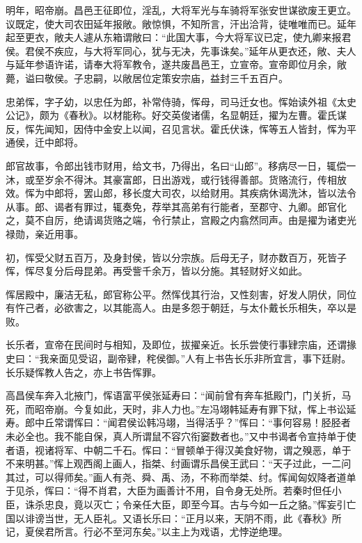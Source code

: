 \documentclass[12pt,UTF8]{ctexbook}
\begin{document}
明年，昭帝崩。昌邑王征即位，淫乱，大将军光与车骑将军张安世谋欲废王更立。议既定，使大司农田延年报敞。敞惊惧，不知所言，汗出洽背，徒唯唯而已。延年起至更衣，敞夫人遽从东箱谓敞曰：“此国大事，今大将军议已定，使九卿来报君侯。君侯不疾应，与大将军同心，犹与无决，先事诛矣。”延年从更衣还，敞、夫人与延年参语许诺，请奉大将军教令，遂共废昌邑王，立宣帝。宣帝即位月余，敞薨，谥曰敬侯。子忠嗣，以敞居位定策安宗庙，益封三千五百户。



忠弟恽，字子幼，以忠任为郎，补常侍骑，恽母，司马迁女也。恽始读外祖《太史公记》，颇为《春秋》。以材能称。好交英俊诸儒，名显朝廷，擢为左曹。霍氏谋反，恽先闻知，因侍中金安上以闻，召见言状。霍氏伏诛，恽等五人皆封，恽为平通侯，迁中郎将。



郎官故事，令郎出钱市财用，给文书，乃得出，名曰“山郎”。移病尽一日，辄偿一沐，或至岁余不得沐。其豪富郎，日出游戏，或行钱得善部。货赂流行，传相放效。恽为中郎将，罢山郎，移长度大司农，以给财用。其疾病休谒洗沐，皆以法令从事。郎、谒者有罪过，辄奏免，荐举其高弟有行能者，至郡守、九卿。郎官化之，莫不自厉，绝请谒货赂之端，令行禁止，宫殿之内翕然同声。由是擢为诸吏光禄勋，亲近用事。



初，恽受父财五百万，及身封侯，皆以分宗族。后母无子，财亦数百万，死皆子恽，恽尽复分后母昆弟。再受訾千余万，皆以分施。其轻财好义如此。



恽居殿中，廉洁无私，郎官称公平。然恽伐其行治，又性刻害，好发人阴伏，同位有忤己者，必欲害之，以其能高人。由是多怨于朝廷，与太仆戴长乐相失，卒以是败。



长乐者，宣帝在民间时与相知，及即位，拔擢亲近。长乐尝使行事肄宗庙，还谓掾史曰：“我亲面见受诏，副帝肄，秺侯御。”人有上书告长乐非所宜言，事下廷尉。长乐疑恽教人告之，亦上书告恽罪。



高昌侯车奔入北掖门，恽语富平侯张延寿曰：“闻前曾有奔车抵殿门，门关折，马死，而昭帝崩。今复如此，天时，非人力也。”左冯翊韩延寿有罪下狱，恽上书讼延寿。郎中丘常谓恽曰：“闻君侯讼韩冯翊，当得活乎？”恽曰：“事何容易！胫胫者未必全也。我不能自保，真人所谓鼠不容穴衔窭数者也。”又中书谒者令宣持单于使者语，视诸将军、中朝二千石。恽曰：“冒顿单于得汉美食好物，谓之殠恶，单于不来明甚。”恽上观西阁上画人，指桀、纣画谓乐昌侯王武曰：“天子过此，一二问其过，可以得师矣。”画人有尧、舜、禹、汤，不称而举桀、纣。恽闻匈奴降者道单于见杀，恽曰：“得不肖君，大臣为画善计不用，自令身无处所。若秦时但任小臣，诛杀忠良，竟以灭亡；令亲任大臣，即至今耳。古与今如一丘之貉。”恽妄引亡国以诽谤当世，无人臣礼。又语长乐曰：“正月以来，天阴不雨，此《春秋》所记，夏侯君所言。行必不至河东矣。”以主上为戏语，尤悖逆绝理。
\end{document}
